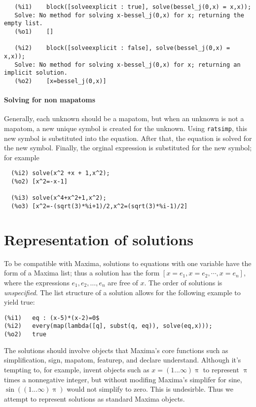 \documentclass[]{scrartcl}
\begin{document}
\begin{verbatim}
   (%i1)	block([solveexplicit : true], solve(bessel_j(0,x) = x,x));
   Solve: No method for solving x-bessel_j(0,x) for x; returning the empty list.
   (%o1)	[]

   (%i2)	block([solveexplicit : false], solve(bessel_j(0,x) = x,x));
   Solve: No method for solving x-bessel_j(0,x) for x; returning an implicit solution.
   (%o2)	[x=bessel_j(0,x)]
\end{verbatim}
\paragraph{Solving for non mapatoms} Generally, each unknown should be a mapatom, but when an unknown is not a mapatom, a new unique symbol is created for the unknown. Using \texttt{ratsimp}, this new symbol is substituted into the equation.  After that, the equation is solved for the new symbol. Finally, the orginal expression is substituted for the new symbol; for example
\begin{verbatim}
  (%i2)	solve(x^2 +x + 1,x^2);
  (%o2)	[x^2=-x-1]

  (%i3)	solve(x^4+x^2+1,x^2);
  (%o3)	[x^2=-(sqrt(3)*%i+1)/2,x^2=(sqrt(3)*%i-1)/2]
\end{verbatim}

\section{Representation of solutions}

To be compatible with Maxima, solutions to equations with one variable have the form of a Maxima
list; thus a solution has the form \([x = e_1, x = e_2, \cdots, x = e_n]\), where the
expressions \(e_1, e_2, \dots, e_n\) are free of \(x\). The order of solutions is
\emph{unspecified}. The list structure of a solution allows for the following example to
yield true:

\begin{verbatim}
(%i1)	eq : (x-5)*(x-2)=0$
(%i2)	every(map(lambda([q], subst(q, eq)), solve(eq,x)));
(%o2)	true
\end{verbatim}

The solutions should involve objects that Maxima's core functions such as simplification,
sign, mapatom, featurep, and declare understand. Although it's tempting to, for example,
invent objects such as \(x = (1 ... \infty) \uppi\) to represent \(\uppi\) times a nonnegative
integer, but without modifing Maxima's simplifer for sine,
\(\sin \left ((1 ... \infty) \uppi \right) \) would not simplify  to zero. This is undesirble.
Thus we attempt to represent solutions as standard Maxima objects.
\end{document}

